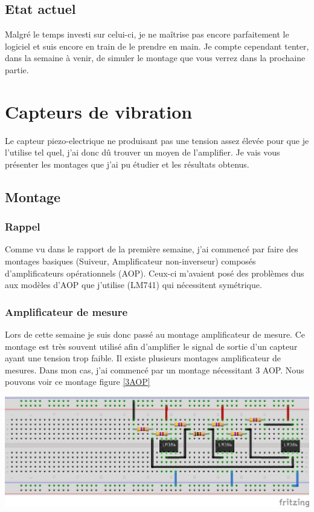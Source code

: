 \documentclass[11pt,french,a4paper]{article}
\begin{document}
\subsection{Etat actuel}
Malgré le temps investi sur celui-ci, je ne maîtrise pas encore parfaitement le logiciel et suis encore en train de le prendre en main. Je compte cependant tenter, dans la semaine à venir, de simuler le montage que vous verrez dans la prochaine partie. 
\newpage
\section{Capteurs de vibration}
Le capteur piezo-electrique ne produisant pas une tension assez élevée pour que je l’utilise tel quel, j’ai donc dû trouver un moyen de l’amplifier. Je vais vous présenter les montages que j’ai pu étudier et les résultats obtenus.

\subsection{Montage}
\subsubsection{Rappel}

Comme vu dans le rapport de la première semaine, j’ai commencé par faire des montages basiques (Suiveur, Amplificateur non-inverseur) composés d’amplificateurs opérationnels (AOP). Ceux-ci m’avaient posé des problèmes dus aux modèles d’AOP que j’utilise (LM741) qui nécessitent symétrique.

\subsubsection{Amplificateur de mesure}

Lors de cette semaine je suis donc passé au montage amplificateur de mesure. Ce montage est très souvent utilisé afin d’amplifier le signal de sortie d’un capteur ayant une tension trop faible.
Il existe plusieurs montages amplificateur de mesures. Dans mon cas, j’ai commencé par un montage nécessitant 3 AOP. Nous pouvons voir ce montage figure \ref{3AOP}

\begin{center}	
\includegraphics[scale=1]{../img/instrumentation3aop_bb.png}
\label{3AOP}
\end{center}
\end{document}
